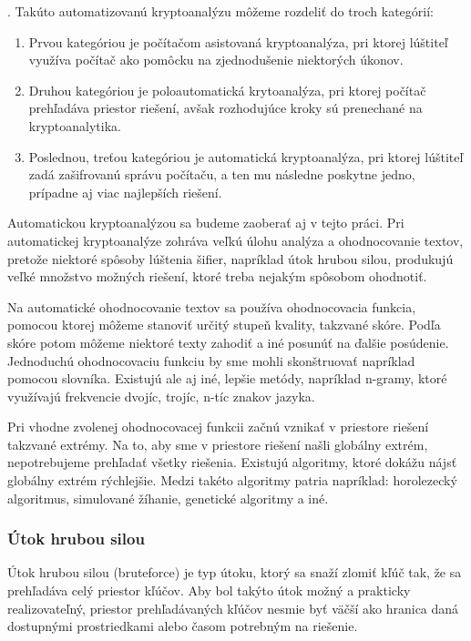 .
Takúto automatizovanú kryptoanalýzu môžeme rozdeliť do troch kategórií:
\begin{enumerate}
\item
Prvou kategóriou je počítačom asistovaná kryptoanalýza, pri ktorej lúštiteľ využíva
počítač ako pomôcku na zjednodušenie niektorých úkonov.
\item
Druhou kategóriou je poloautomatická krytoanalýza, pri ktorej počítač prehľadáva priestor riešení, avšak
rozhodujúce kroky sú prenechané na kryptoanalytika.
\item
Poslednou, treťou kategóriou je automatická kryptoanalýza, pri ktorej lúštiteľ zadá zašifrovanú správu počítaču, a ten mu následne poskytne jedno, prípadne aj viac najlepších riešení.
\end{enumerate}

Automatickou kryptoanalýzou sa budeme zaoberať aj v tejto práci.
Pri automatickej kryptoanalýze zohráva veľkú úlohu analýza a ohodnocovanie textov, pretože niektoré spôsoby lúštenia šifier,
napríklad útok hrubou silou, produkujú veľké množstvo možných riešení, ktoré treba nejakým spôsobom ohodnotiť.

Na automatické ohodnocovanie textov sa používa ohodnocovacia funkcia, pomocou ktorej môžeme stanoviť určitý stupeň kvality, takzvané skóre.
Podľa skóre potom môžeme niektoré texty zahodiť a iné posunúť na ďalšie posúdenie.
Jednoduchú ohodnocovaciu funkciu by sme mohli skonštruovať napríklad pomocou slovníka.
Existujú ale aj iné, lepšie metódy, napríklad n-gramy, ktoré využívajú frekvencie dvojíc, trojíc, n-tíc znakov jazyka.

Pri vhodne zvolenej ohodnocovacej funkcii začnú vznikať v priestore riešení takzvané extrémy. Na to, aby sme v priestore riešení našli globálny extrém, nepotrebujeme prehľadať všetky riešenia. Existujú algoritmy, ktoré dokážu nájsť globálny extrém rýchlejšie.
Medzi takéto algoritmy patria napríklad: horolezecký algoritmus, simulované žíhanie, genetické algoritmy a iné.

\subsubsection{Útok hrubou silou}
Útok hrubou silou (bruteforce) je typ útoku, ktorý sa snaží zlomiť kľúč tak, že sa prehľadáva celý priestor kľúčov.
Aby bol takýto útok možný a prakticky realizovateľný, priestor prehľadávaných kľúčov nesmie byť väčší ako hranica daná dostupnými
prostriedkami alebo časom potrebným na riešenie.

